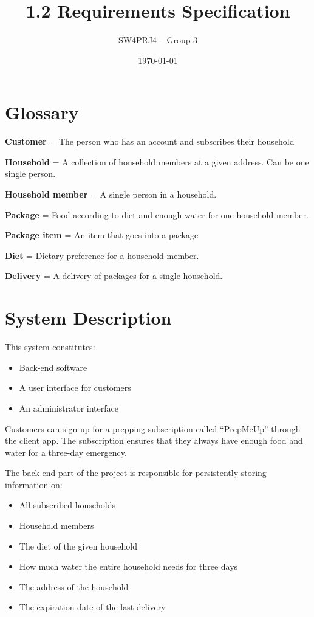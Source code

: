 \documentclass[a4paper,11pt]{article}
\title{1.2 Requirements Specification}
\author{SW4PRJ4 -- Group 3}
\date{\today}
\begin{document}
\maketitle

\section{Glossary}

\textbf{Customer} = The person who has an account and subscribes their household

\textbf{Household} = A collection of household members at a given address. Can be one single person.

\textbf{Household member} = A single person in a household.

\textbf{Package} = Food according to diet and enough water for one household member.

\textbf{Package item} = An item that goes into a package

\textbf{Diet} = Dietary preference for a household member.

\textbf{Delivery} = A delivery of packages for a single household.


\section{System Description}
This system constitutes:
\begin{itemize}
    \item Back-end software
    \item A user interface for customers
    \item An administrator interface
\end{itemize}

Customers can sign up for a prepping subscription called ``PrepMeUp'' through the client app. The subscription ensures that they always have enough food and water for a three-day emergency.


The back-end part of the project is responsible for persistently storing information on:
\begin{itemize}
    \item All subscribed households
    \item Household members
    \item The diet of the given household
    \item How much water the entire household needs for three days
    \item The address of the household
    \item The expiration date of the last delivery
\end{itemize}
\end{document}
